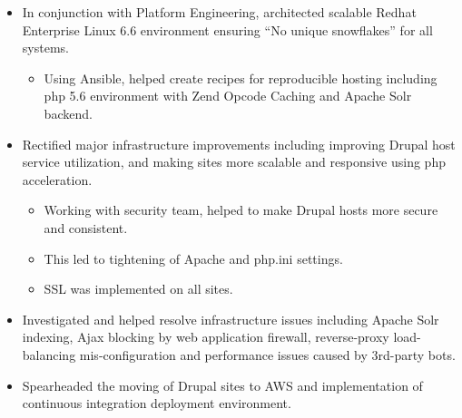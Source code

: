 \documentclass[11pt,a4paper,sans]{moderncv}   %
\begin{document}
{\begin{itemize}
\begin{itemize}
    \end{itemize}
  \item In conjunction with Platform Engineering, architected scalable Redhat Enterprise Linux 6.6 environment ensuring “No unique snowflakes” for all systems.
    \begin{itemize}%
    \item Using Ansible, helped create recipes for reproducible hosting including php 5.6 environment with Zend Opcode Caching and Apache Solr backend.
    \end{itemize}
  \item Rectified major infrastructure improvements including improving Drupal host service utilization, and making sites more scalable and responsive using php acceleration.
    \begin{itemize}%
    \item  Working with security team, helped to make Drupal hosts more secure and consistent.
    \item This led to tightening of Apache and php.ini settings.
    \item SSL was implemented on all sites.
    \end{itemize}
  \item Investigated and helped resolve infrastructure issues including Apache Solr indexing, Ajax blocking by web application firewall, reverse-proxy load-balancing mis-configuration and performance issues caused by 3rd-party bots.
  \item Spearheaded the moving of Drupal sites to AWS and implementation of continuous integration deployment environment.
  \end{itemize}
}
\end{document}
